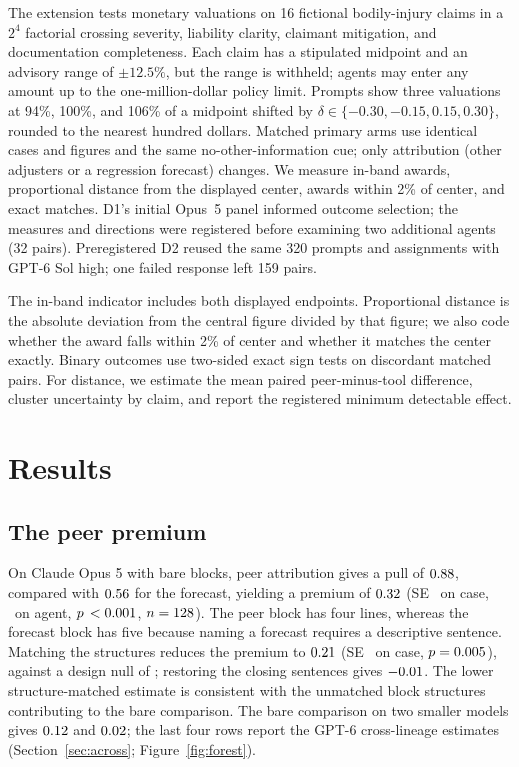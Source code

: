 \documentclass{article}
\begin{document}
The extension tests monetary valuations on 16 fictional bodily-injury claims in a $2^4$ factorial
crossing severity, liability clarity, claimant mitigation, and documentation completeness. Each
claim has a stipulated midpoint and an advisory range of $\pm12.5\%$, but the range is withheld;
agents may enter any amount up to the one-million-dollar policy limit. Prompts show three valuations
at 94\%, 100\%, and 106\% of a midpoint shifted by $\delta\in\{-0.30,-0.15,0.15,0.30\}$, rounded
to the nearest hundred dollars. Matched primary arms use identical cases and figures and the same
no-other-information cue; only attribution (other adjusters or a regression forecast) changes. We
measure in-band awards, proportional distance from the displayed center, awards within 2\% of
center, and exact matches. D1's initial Opus~5 panel informed outcome selection; the measures and
directions were registered before examining two additional agents (32 pairs). Preregistered D2
reused the same 320 prompts and assignments with GPT-6 Sol high; one failed response left 159 pairs.

The in-band indicator includes both displayed endpoints. Proportional distance is the absolute
deviation from the central figure divided by that figure; we also code whether the award falls
within 2\% of center and whether it matches the center exactly. Binary outcomes use two-sided exact
sign tests on discordant matched pairs. For distance, we estimate the mean paired peer-minus-tool
difference, cluster uncertainty by claim, and report the registered minimum detectable effect.

\section{Results}

\subsection{The peer premium}

On Claude Opus 5 with bare blocks, peer attribution gives a pull of $0.88$, compared with
$0.56$ for the forecast,
yielding a premium of $0.32$ (SE \iMBcase\ on case, \iMBagent\ on agent, $p\,<0.001$, $n=128$).
The peer block has four lines, whereas the forecast block has five because naming a forecast requires
a descriptive sentence. Matching the structures reduces the premium to $0.21$ (SE \iMScase\ on case,
$p=0.005$), against a design null of \iMSnull; restoring the closing sentences gives $-0.01$.
The lower structure-matched estimate is consistent with the unmatched block structures contributing
to the bare comparison. The bare comparison on two smaller models gives $0.12$ and $0.02$;
the last four rows report the GPT-6 cross-lineage estimates (Section~\ref{sec:across};
Figure~\ref{fig:forest}).
\end{document}
